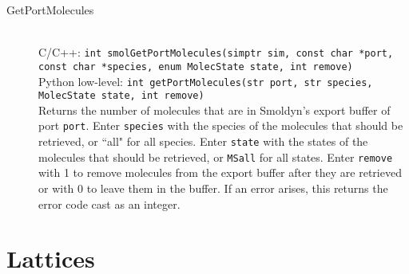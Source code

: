 \documentclass {book}
\newcommand {\ttt} {\texttt}
\begin{document}
\begin{description}
\item[GetPortMolecules]
\hfill \\
C/C++: \ttt{int smolGetPortMolecules(simptr sim, const char *port, const char *species, enum MolecState state, int remove)}\\
Python low-level: \ttt{int getPortMolecules(str port, str species, MolecState state, int remove)}\\
Returns the number of molecules that are in Smoldyn's export buffer of port \ttt{port}. Enter \ttt{species} with the species of the molecules that should be retrieved, or ``all" for all species. Enter \ttt{state} with the states of the molecules that should be retrieved, or \ttt{MSall} for all states. Enter \ttt{remove} with 1 to remove molecules from the export buffer after they are retrieved or with 0 to leave them in the buffer. If an error arises, this returns the error code cast as an integer.

\end{description}


\section{Lattices}
\end{document}
